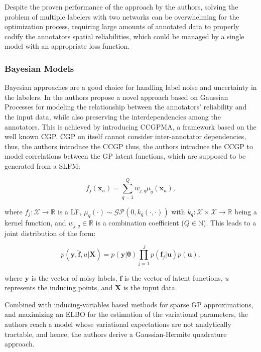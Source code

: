 Despite the proven performance of the approach by the authors,
solving the problem of multiple labelers with two networks can be
overwhelming for the optimization process, requiring large amounts of
annotated data to properly codify the annotators spatial
reliabilities, which could be managed by a single model with an
appropriate loss function.

\subsubsection{Bayesian Models}\label{subsec:bayesian_models}

Bayesian approaches are a good choice for handling label noise
and uncertainty in the labelers. In \cite{GilEtAlvarez2023CCGPMA} the
authors propose a novel approach based on Gaussian Processes for
modeling the relationship between the annotators' reliability and the
input data, while also preserving the interdependencies among the
annotators. This is achieved by introducing \gls{CCGPMA}, a framework
based on the well known \gls{CGP}. \gls{CGP} on itself cannot consider
inter-annotator dependencies, thus, the authors introduce the \gls{CCGP}
thus, the authors introduce the \gls{CCGP} to model correlations
between the GP latent functions, which are supposed to be generated
from a \gls{SLFM}:

\begin{equation}
  f_j(\mathbf{x}_n) = \sum_{q=1}^{Q} w_{j,q} \mu_q(\mathbf{x}_n),
\end{equation}

where $f_j : \mathcal{X} \to \mathbb{R}$ is a \gls{LF}, $\mu_q(\cdot) \sim
\mathcal{GP}(0, k_q(\cdot, \cdot))$ with $k_q : \mathcal{X} \times
\mathcal{X} \to \mathbb{R}$ being a kernel function, and $w_{j,q} \in
\mathbb{R}$ is a combination coefficient ($Q \in \mathbb{N}$). This leads
to a joint distribution of the form:

\begin{equation}
  p(\mathbf{y}, \hat{\mathbf{f}}, u | \mathbf{X}) = p(\mathbf{y} |
  \boldsymbol{\theta}) \prod_{j=1}^{J} p(\mathbf{f}_j | \mathbf{u})
  p(\mathbf{u}),
\end{equation}

where $\mathbf{y}$ is the vector of noisy labels, $\hat{\mathbf{f}}$
is the vector of latent functions, $u$ represents the inducing points,
and $\mathbf{X}$ is the input data.

Combined with inducing-variables based methods for sparse GP
approximations, and maximizing an \gls{ELBO} for the estimation of the
variational parameters, the authors reach a model whose variational
expectations are not analytically tractable, and hence, the authors
derive a Gaussian-Hermite quadrature approach.

